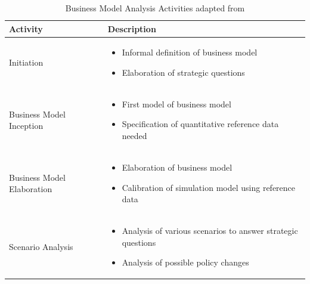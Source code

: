 \begin{table}[t]
	\caption[Business Model Analysis Activities]{Business Model Analysis Activities adapted from \citet{Grasl2008}}
	\label{tab:bmaa}
	\centering
	\begin{tabular}{L{.25\textwidth}L{.65\textwidth}}
			\toprule 
			\footnotesize \textbf{Activity} &
			\footnotesize \textbf{Description} \\ \midrule
			\footnotesize Initiation &
			\vspace{-4mm}
			\footnotesize
			\begin{itemize}[leftmargin=*, parsep=0pt, topsep=0pt, itemsep=0pt]
				\item Informal definition of business model
				\item Elaboration of strategic questions \vspace{-\baselineskip} 
			\end{itemize}	\\ \midrule
			\footnotesize Business Model Inception &
			\vspace{-4mm}
			\footnotesize
			\begin{itemize}[leftmargin=*, parsep=0pt, topsep=0pt, itemsep=0pt]
				\item First model of business model
				\item Specification of quantitative reference data needed \vspace{-\baselineskip} 
			\end{itemize}	\\ \midrule
			\footnotesize Business Model Elaboration &
			\vspace{-4mm}
			\footnotesize
			\begin{itemize}[leftmargin=*, parsep=0pt, topsep=0pt, itemsep=0pt]
				\item Elaboration of business model
				\item Calibration of simulation model using reference data \vspace{-\baselineskip} 
			\end{itemize}	\\ \midrule
			\footnotesize Scenario Analysis &
			\vspace{-4mm}
			\footnotesize
			\begin{itemize}[leftmargin=*, parsep=0pt, topsep=0pt, itemsep=0pt]
				\item Analysis of various scenarios to answer strategic questions
				\item Analysis of possible policy changes \vspace{-\baselineskip} 

\end{itemize}
\end{tabular}
\end{table}
